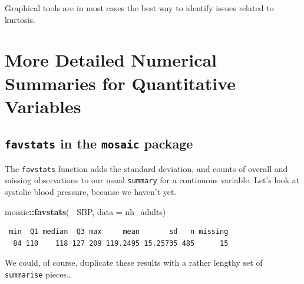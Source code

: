 \documentclass[
]{book}
\newenvironment{Shaded}{\begin{snugshade}}{\end{snugshade}}
\newcommand{\DataTypeTok}[1]{\textcolor[rgb]{0.13,0.29,0.53}{#1}}
\newcommand{\FloatTok}[1]{\textcolor[rgb]{0.00,0.00,0.81}{#1}}
\newcommand{\KeywordTok}[1]{\textcolor[rgb]{0.13,0.29,0.53}{\textbf{#1}}}
\newcommand{\NormalTok}[1]{#1}
\newcommand{\OperatorTok}[1]{\textcolor[rgb]{0.81,0.36,0.00}{\textbf{#1}}}
\newcommand{\StringTok}[1]{\textcolor[rgb]{0.31,0.60,0.02}{#1}}
\begin{document}
Graphical tools are in most cases the best way to identify issues related to kurtosis.

\hypertarget{more-detailed-numerical-summaries-for-quantitative-variables}{%
\section{More Detailed Numerical Summaries for Quantitative Variables}\label{more-detailed-numerical-summaries-for-quantitative-variables}}

\hypertarget{favstats-in-the-mosaic-package}{%
\subsection{\texorpdfstring{\texttt{favstats} in the \texttt{mosaic} package}{favstats in the mosaic package}}\label{favstats-in-the-mosaic-package}}

The \texttt{favstats} function adds the standard deviation, and counts of overall and missing observations to our usual \texttt{summary} for a continuous variable. Let's look at systolic blood pressure, because we haven't yet.

\begin{Shaded}
\begin{Highlighting}[]
\NormalTok{mosaic}\OperatorTok{::}\KeywordTok{favstats}\NormalTok{(}\OperatorTok{~}\StringTok{ }\NormalTok{SBP, }\DataTypeTok{data =}\NormalTok{ nh_adults)}
\end{Highlighting}
\end{Shaded}

\begin{verbatim}
 min  Q1 median  Q3 max     mean       sd   n missing
  84 110    118 127 209 119.2495 15.25735 485      15
\end{verbatim}

We could, of course, duplicate these results with a rather lengthy set of \texttt{summarise} pieces\ldots{}

\begin{Shaded}
\end{Shaded}
\end{document}

